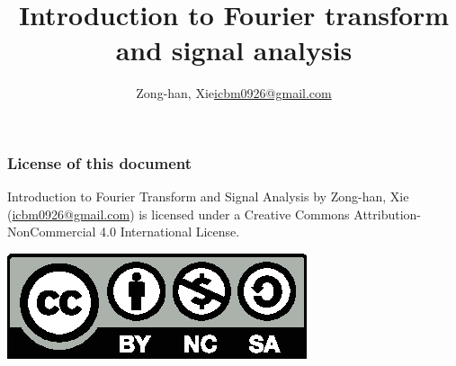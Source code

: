 \documentclass{beamer}
\title{Introduction to Fourier transform and signal analysis}
\author{\texorpdfstring{Zong-han, Xie\newline\url{icbm0926@gmail.com}}{Zong-han, Xie}}
\begin{document}
\begin{frame}
\titlepage
\end{frame}
\begin{frame}[label=licensepage]
\frametitle{License of this document}
Introduction to Fourier Transform and Signal Analysis by Zong-han, Xie (\href{icbm0926@gmail.com}{icbm0926@gmail.com}) is licensed under a Creative Commons Attribution-NonCommercial 4.0 International License. \newline
\begin{center}
\includegraphics[scale=1]{by-nc-sa.eps}
\end{center}
\end{frame}
\end{document}
